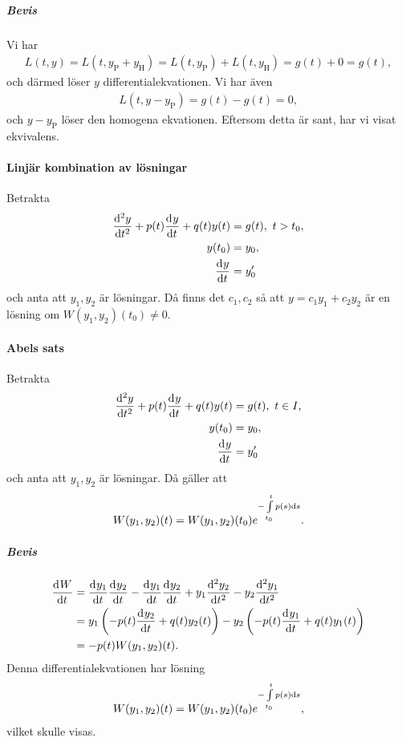 \subparagraph{Bevis}
Vi har
\begin{align*}
	L(t, y) = L(t, y_{\text{P}} + y_{\text{H}}) = L(t, y_{\text{P}}) + L(t, y_{\text{H}}) = g(t) + 0 = g(t),
\end{align*}
och därmed löser $y$ differentialekvationen. Vi har även
\begin{align*}
	L(t, y - y_{\text{P}}) = g(t) - g(t) = 0,
\end{align*}
och $y - y_{\text{P}}$ löser den homogena ekvationen. Eftersom detta är sant, har vi visat ekvivalens.

\paragraph{Linjär kombination av lösningar}
Betrakta
\begin{align*}
	\dv[2]{y}{t} (t) + p(t)\dv[]{y}{t} (t) + q(t)y(t) &= g(t),\ t > t_0, \\
	y(t_0)                                              &= y_0, \\
	\dv[]{y}{t} (t_{0})                                 &= y'_{0}
\end{align*}
och anta att $y_{1}, y_{2}$ är lösningar. Då finns det $c_{1}, c_{2}$ så att $y = c_{1}y_{1} + c_{2}y_{2}$ är en lösning om $W(y_{1}, y_{2})(t_{0}) \neq 0$.

\paragraph{Abels sats}
Betrakta
\begin{align*}
	\deval[2]{y}{t}{t} + p(t)\deval{y}{t}{t} + q(t)y(t) &= g(t),\ t\in I, \\
	y(t_0)                                              &= y_0, \\
	\deval{y}{t}{t_{0}}                                 &= y'_{0}
\end{align*}
och anta att $y_{1}, y_{2}$ är lösningar. Då gäller att
\begin{align*}
	W(y_{1}, y_{2})(t) = W(y_{1}, y_{2})(t_{0})e^{-\int\limits_{t_{0}}^{t}p(s)\dd{s}}.
\end{align*}

\subparagraph{Bevis}
\begin{align*}
	\dv[]{W}{t} (t) &= \dv[]{y_{1}}{t} (t)\dv[]{y_{2}}{t} (t) - \dv[]{y_{1}}{t} (t)\dv[]{y_{2}}{t} (t) + y_{1}\dv[2]{y_{2}}{t} (t) - y_{2}\dv[2]{y_{1}}{t} (t) \\
	                &= y_{1}\left(-p(t)\dv[]{y_{2}}{t} (t) + q(t)y_{2}(t)\right) - y_{2}\left(-p(t)\dv[]{y_{1}}{t} (t) + q(t)y_{1}(t)\right) \\
	                &= -p(t)W(y_{1}, y_{2})(t).
\end{align*}
Denna differentialekvationen har lösning
\begin{align*}
	W(y_{1}, y_{2})(t) = W(y_{1}, y_{2})(t_{0})e^{-\int\limits_{t_{0}}^{t}p(s)\dd{s}},
\end{align*}
vilket skulle visas.

